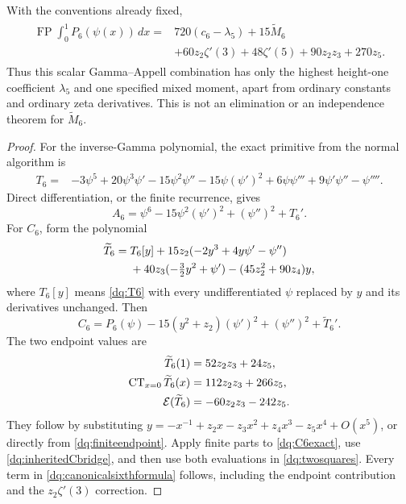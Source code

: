 \begin{theorem}
\label{dq:canonicalsixth}
With the conventions already fixed,
\begin{align}
 \boxed{\begin{aligned}
 \operatorname{FP}\int_0^1P_6(\psi(x))\,dx
 ={}&720(c_6-\lambda_5)+15\widetilde M_6\\
 &+60z_2\zeta'(3)+48\zeta'(5)+90z_2z_3+270z_5.
 \end{aligned}}
 \label{dq:canonicalsixthformula}
\end{align}
Thus this scalar Gamma--Appell combination has only the highest
height-one coefficient $\lambda_5$ and one specified mixed moment,
apart from ordinary constants and ordinary zeta derivatives. This is
not an elimination or an independence theorem for $\widetilde M_6$.
\end{theorem}

\begin{proof}
For the inverse-Gamma polynomial, the exact primitive from the normal
algorithm is
\begin{align}
 T_6={}&-3\psi^5+20\psi^3\psi'-15\psi^2\psi''
       -15\psi(\psi')^2+6\psi\psi'''+9\psi'\psi''-\psi''''.
 \label{dq:T6}
\end{align}
Direct differentiation, or the finite recurrence, gives
\[
 A_6=\psi^6-15\psi^2(\psi')^2+(\psi'')^2+T_6'.
\]
For $C_6$, form the polynomial
\begin{align}
 \widetilde T_6={}&T_6[y]
  +15z_2(-2y^3+4y\psi'-\psi'')\notag\\
  &+40z_3(-\tfrac32y^2+\psi')-(45z_2^2+90z_4)y,
 \label{dq:TC6}
\end{align}
where $T_6[y]$ means \eqref{dq:T6} with every undifferentiated
$\psi$ replaced by $y$ and its derivatives unchanged. Then
\begin{equation}\label{dq:C6exact}
 C_6=P_6(\psi)-15(y^2+z_2)(\psi')^2+(\psi'')^2
                              +\widetilde T_6'.
\end{equation}
The two endpoint values are
\begin{align}
 \widetilde T_6(1)&=52z_2z_3+24z_5,\notag\\
 \operatorname{CT}_{x=0}\widetilde T_6(x)
                  &=112z_2z_3+266z_5,\notag\\
 \mathcal E(\widetilde T_6)&=-60z_2z_3-242z_5.
 \label{dq:C6endpoints}
\end{align}
They follow by substituting
$y=-x^{-1}+z_2x-z_3x^2+z_4x^3-z_5x^4+O(x^5)$,
or directly from \eqref{dq:finiteendpoint}. Apply finite parts to
\eqref{dq:C6exact}, use \eqref{dq:inheritedCbridge}, and then use
both evaluations in \eqref{dq:twosquares}. Every term in
\eqref{dq:canonicalsixthformula} follows, including the endpoint
contribution and the $z_2\zeta'(3)$ correction.
\end{proof}

